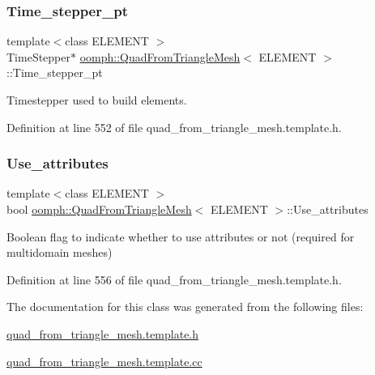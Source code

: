 \subsubsection{\texorpdfstring{Time\+\_\+stepper\+\_\+pt}{Time\_stepper\_pt}}
{\footnotesize\ttfamily template$<$class E\+L\+E\+M\+E\+NT $>$ \\
Time\+Stepper$\ast$ \hyperlink{classoomph_1_1QuadFromTriangleMesh}{oomph\+::\+Quad\+From\+Triangle\+Mesh}$<$ E\+L\+E\+M\+E\+NT $>$\+::Time\+\_\+stepper\+\_\+pt}



Timestepper used to build elements. 



Definition at line 552 of file quad\+\_\+from\+\_\+triangle\+\_\+mesh.\+template.\+h.

\mbox{\label{classoomph_1_1QuadFromTriangleMesh_ac654f77f031a4126e6e2707d1fa7dad1}} 
\subsubsection{\texorpdfstring{Use\+\_\+attributes}{Use\_attributes}}
{\footnotesize\ttfamily template$<$class E\+L\+E\+M\+E\+NT $>$ \\
bool \hyperlink{classoomph_1_1QuadFromTriangleMesh}{oomph\+::\+Quad\+From\+Triangle\+Mesh}$<$ E\+L\+E\+M\+E\+NT $>$\+::Use\+\_\+attributes}

Boolean flag to indicate whether to use attributes or not (required for multidomain meshes) 

Definition at line 556 of file quad\+\_\+from\+\_\+triangle\+\_\+mesh.\+template.\+h.



The documentation for this class was generated from the following files\+:\begin{DoxyCompactItemize}
\item 
\hyperlink{quad__from__triangle__mesh_8template_8h}{quad\+\_\+from\+\_\+triangle\+\_\+mesh.\+template.\+h}\item 
\hyperlink{quad__from__triangle__mesh_8template_8cc}{quad\+\_\+from\+\_\+triangle\+\_\+mesh.\+template.\+cc}\end{DoxyCompactItemize}
